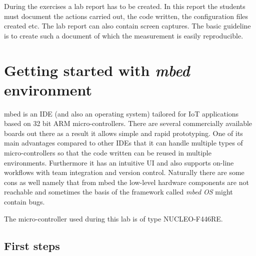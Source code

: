 \documentclass[a4paper]{article}
\begin{document}
During the exercises a lab report has to be created. In this report the students must document the actions carried out,
the code written, the configuration files created etc. The lab report can also contain screen captures. The basic
guideline is to create such a document of which the measurement is easily reproducible.

\section{Getting started with \emph{\textbf{mbed}} environment}

mbed is an IDE (and also an operating system) tailored for IoT applications based on 32 bit ARM micro-controllers.
There
are several commercially available boards out there as a result it allows simple and rapid prototyping. One of its main
advantages compared to other IDEs that it can handle multiple types of micro-controllers so that the code written can
be reused in multiple environments. Furthermore it has an intuitive UI and also supports on-line workflows with team
integration and version control. Naturally there are some cons as well namely that from mbed the low-level hardware
components are not reachable and sometimes the basis of the framework called \emph{mbed OS} might contain bugs.

The micro-controller used during this lab is of type NUCLEO-F446RE.

\subsection{First steps}
\end{document}
